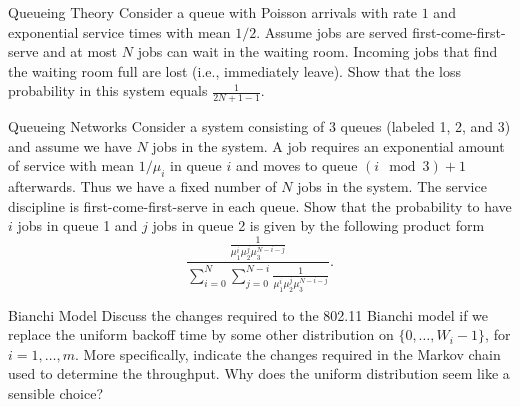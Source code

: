 \begin{problem}{Queueing Theory}
Consider a queue with Poisson arrivals with rate $1$ and exponential
service times with mean $1/2$. Assume jobs are served first-come-first-serve and at most
$N$ jobs can wait in the waiting room. Incoming jobs that find the waiting room full
are lost (i.e., immediately leave). Show that the loss probability in this system equals
$\frac{1}{2N + 1 - 1}$.
\end{problem}

\begin{problem}{Queueing Networks}
Consider a system consisting of 3 queues (labeled 1, 2, and 3)
and assume we have $N$ jobs in the system. A job requires an exponential amount of
service with mean $1/\mu_i$ in queue $i$ and moves to queue $(i \mod 3) + 1$ afterwards. Thus
we have a fixed number of $N$ jobs in the system. The service discipline is first-come-first-serve in each queue. Show that the probability to have $i$ jobs in queue 1 and $j$ jobs
in queue 2 is given by the following product form
\[
\frac{\frac{1}{\mu_1^i \mu_2^j \mu_3^{N-i-j}}}{\sum_{i=0}^{N} \sum_{j=0}^{N-i} \frac{1}{\mu_1^i \mu_2^j \mu_3^{N-i-j}}}.
\]
\end{problem}

\begin{problem}{Bianchi Model}
Discuss the changes required to the 802.11 Bianchi model if we replace
the uniform backoff time by some other distribution on $\{0, \ldots, W_i -1\}$, for $i = 1, \ldots, m$.
More specifically, indicate the changes required in the Markov chain used to determine
the throughput. Why does the uniform distribution seem like a sensible choice?
\end{problem}